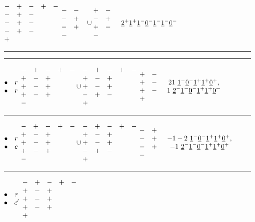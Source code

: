\documentclass[11pt ,reqno]{amsart}
\begin{document}
$\begin{matrix} -&+&-&+&-\\ -&+&-&&\\-&+&-&&\\-&+&-&&\\+&&&&\end{matrix}$
\qquad $\begin{matrix} +&-\\-&+\\-&+\\+&&\end{matrix}\cup\begin{matrix} +&-\\-&+\\+&-\\-&&\end{matrix} $
\qquad 
\qquad ${\underline{2}}^+{\underline{1}}^+{\underline{1}}^-{\underline{0}}^-{\underline{1}}^-{\underline{1}}^-{\underline{0}}^-$
\hfill
\medskip
\hrule
\hrule
\medskip
$\begin{matrix} \bullet&r\\ \bullet&r\end{matrix}$\qquad  
$\begin{matrix} -&+&-&+&-\\ +&-&+&&\\+&-&+&&\\+&-&+&&\\-&&&&\end{matrix}\cup
\begin{matrix} -&+&-&+&-\\ +&-&+&&\\+&-&+&&\\-&+&-&&\\+&&&&\end{matrix}$
\qquad $\begin{matrix} +&-\\+&-\\+&-\\+&&\end{matrix}$
\qquad $\mat 21\ \ul{1}^-\ul{0}^-\ul{1}^+\ul{1}^+\ul{0}^+,\\ 1\
\ul{2}^-\ul{1}^-\ul{0}^-\ul{1}^+\ul{1}^+\ul{0}^+\emat$ 
\hfill
\medskip
\hrule
\medskip
$\begin{matrix} \bullet&r\\ \bullet&c\end{matrix}$\qquad  
$\begin{matrix} -&+&-&+&-\\ +&-&+&&\\+&-&+&&\\+&-&+&&\\-&&&&\end{matrix}\cup
\begin{matrix} -&+&-&+&-\\ +&-&+&&\\+&-&+&&\\-&+&-&&\\+&&&&\end{matrix}$
\qquad $\begin{matrix} -&+\\-&+\\-&+\\-&&\end{matrix}$
\qquad $\mat -1-2\ \ul{1}^-\ul{0}^-\ul{1}^+\ul{1}^+\ul{0}^+,\\ -1\
\ul{2}^-\ul{1}^-\ul{0}^-\ul{1}^+\ul{1}^+\ul{0}^+\emat$
\hfill
\medskip
\hrule
\medskip
$\begin{matrix} \bullet&r\\ \bullet&c'\end{matrix}$\qquad  
$\begin{matrix} -&+&-&+&-\\ +&-&+&&\\+&-&+&&\\+&-&+&&\\+&&&&\end{matrix}$
\end{document}

